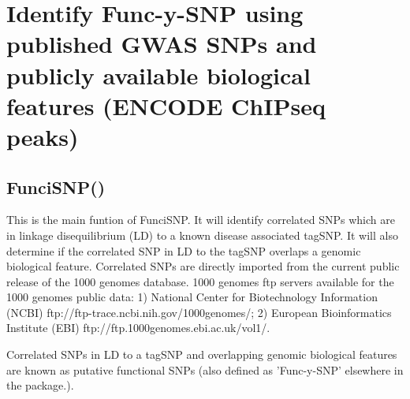 \documentclass[a4paper]{article}
\begin{document}
\section*{Identify Func-y-SNP using published GWAS SNPs and publicly available 
biological features (ENCODE ChIPseq peaks)}
\subsection*{FunciSNP()}
This is the main funtion of FunciSNP. It will identify correlated SNPs which are
 in linkage disequilibrium (LD) to a known disease associated tagSNP. It will 
also determine if the correlated SNP in LD to the tagSNP overlaps a genomic 
biological feature. Correlated SNPs are directly imported from the current 
public release of the 1000 genomes database. 1000 genomes ftp servers available 
for the 1000 genomes public data: 1) National Center for Biotechnology 
Information (NCBI) ftp://ftp-trace.ncbi.nih.gov/1000genomes/; 2) European 
Bioinformatics Institute (EBI) ftp://ftp.1000genomes.ebi.ac.uk/vol1/.

Correlated SNPs in LD to a tagSNP and overlapping genomic biological features 
are known as putative functional SNPs (also defined as 'Func-y-SNP' elsewhere in
 the package.).
\end{document}
